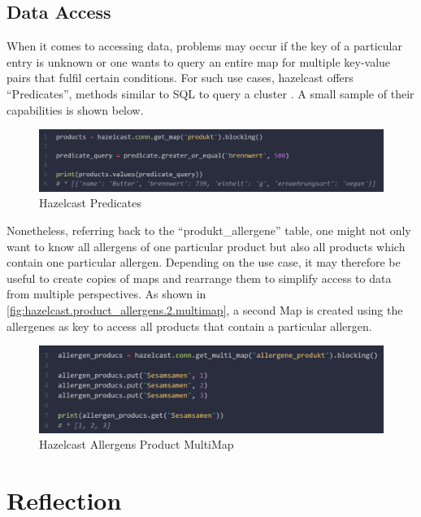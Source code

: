 \subsection{Data Access} \label{subsec:dataAccessHazelcast}

When it comes to accessing data, problems may occur if the key of a particular entry is unknown or one wants 
to query an entire map for multiple key-value pairs that fulfil certain conditions. For such use cases, 
hazelcast offers \enquote{Predicates}, methods similar to SQL to query a cluster \parencite{Hazelcast.Predicates}. 
A small sample of their capabilities is shown below. 

\begin{figure}[H]
    \includegraphics[width=1\textwidth]{images/hazelcast.predicates.png}
    \caption{Hazelcast Predicates} \label{fig:hazelcast.predicates}
\end{figure}

Nonetheless, referring back to the \enquote{produkt\_allergene} table, one might not only want to know all 
allergens of one particular product but also all products which contain one particular allergen. 
Depending on the use case, it may therefore be useful to create copies of maps and rearrange them 
to simplify access to data from multiple perspectives. As shown in 
\autoref{fig:hazelcast.product_allergens.2.multimap}, a second Map is created using the allergenes as key
to access all products that contain a particular allergen.

\begin{figure}[H]
    \includegraphics[width=1\textwidth]{images/hazelcast.product_allergens.multimap.2.png}
    \caption{Hazelcast Allergens Product MultiMap} \label{fig:hazelcast.product_allergens.2.multimap}
\end{figure}


\section{Reflection} \label{sec:reflectionHazelcast}


